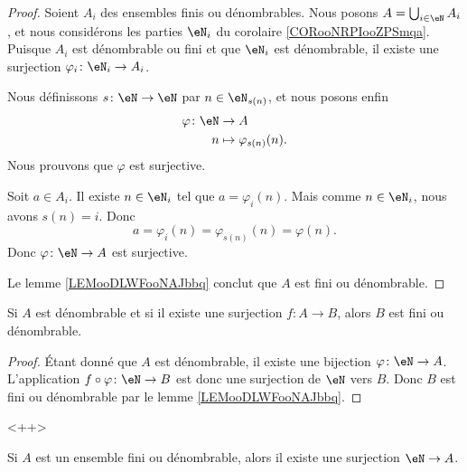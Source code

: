 \begin{proof}
	Soient \( A_i\) des ensembles finis ou dénombrables. Nous posons \( A=\bigcup_{i\in \eN}A_i\), et nous considérons les parties \( \eN_i\) du corolaire \ref{CORooNRPIooZPSmqa}. Puisque \( A_i\) est dénombrable ou fini et que \( \eN_i\) est dénombrable, il existe une surjection \( \varphi_i\colon \eN_i\to A_i\).

	Nous définissons \( s\colon \eN\to \eN\) par \( n\in \eN_{s(n)}\), et nous posons enfin
	\begin{equation}
		\begin{aligned}
			\varphi\colon \eN & \to A                      \\
			n                 & \mapsto \varphi_{s(n)}(n).
		\end{aligned}
	\end{equation}
	Nous prouvons que \( \varphi\) est surjective.

	Soit \( a\in A_i\). Il existe \( n\in \eN_i\) tel que \( a=\varphi_i(n)\). Mais comme \( n\in \eN_i\), nous avons \( s(n)=i\). Donc
	\begin{equation}
		a=\varphi_i(n)=\varphi_{s(n)}(n)=\varphi(n).
	\end{equation}
	Donc \( \varphi\colon \eN\to A\) est surjective.

	Le lemme \ref{LEMooDLWFooNAJbbq} conclut que \( A\) est fini ou dénombrable.
\end{proof}



\begin{lemma}       \label{LEMooDTAEooIBdHyo}
	Si \( A\) est dénombrable et si il existe une surjection \( f\colon A\to B\), alors \( B\) est fini ou dénombrable.
\end{lemma}

\begin{proof}
	Étant donné que \( A\) est dénombrable, il existe une bijection \(\varphi \colon \eN\to A  \). L'application \(f\circ \varphi \colon \eN\to B  \) est donc une surjection de \( \eN\) vers \( B\). Donc \( B\) est fini ou dénombrable par le lemme \ref{LEMooDLWFooNAJbbq}.
\end{proof}<++>


\begin{lemma}       \label{LEMooSRZWooASgEfy}
	Si \( A\) est un ensemble fini ou dénombrable, alors il existe une surjection \( \eN\to A\).
\end{lemma}



